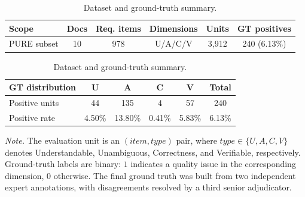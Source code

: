 \begin{table}[!ht]
\centering
\caption{Dataset and ground-truth summary.}
\label{tab:dataset_gt_summary}
\small
\begin{tabular}{lccccc}
\toprule
\textbf{Scope} & \textbf{Docs} & \textbf{Req. items} & \textbf{Dimensions} & \textbf{Units} & \textbf{GT positives} \\
\midrule
PURE subset & 10 & 978 & U/A/C/V & 3,912 & 240 (6.13\%) \\
\bottomrule
\end{tabular}

\vspace{0.6em}

\begin{tabular}{lccccc}
\toprule
\textbf{GT distribution} & \textbf{U} & \textbf{A} & \textbf{C} & \textbf{V} & \textbf{Total} \\
\midrule
Positive units & 44 & 135 & 4 & 57 & 240 \\
Positive rate & 4.50\% & 13.80\% & 0.41\% & 5.83\% & 6.13\% \\
\bottomrule
\end{tabular}

\par\vspace{0.4em}
{\footnotesize \textit{Note.} The evaluation unit is an $(item,type)$ pair, where $type \in \{U,A,C,V\}$ denotes Understandable, Unambiguous, Correctness, and Verifiable, respectively. Ground-truth labels are binary: $1$ indicates a quality issue in the corresponding dimension, $0$ otherwise. The final ground truth was built from two independent expert annotations, with disagreements resolved by a third senior adjudicator.\par}
\end{table}
